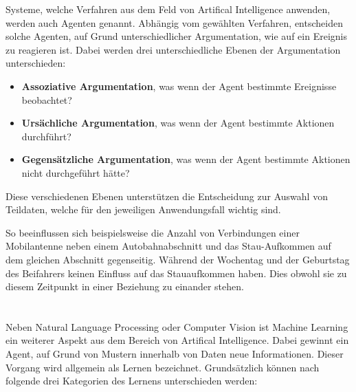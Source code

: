 Systeme, welche Verfahren aus dem Feld von \gls{Artifical Intelligence} anwenden, werden auch Agenten genannt. Abhängig vom gewählten Verfahren, entscheiden solche Agenten, auf Grund unterschiedlicher Argumentation, wie auf ein Ereignis zu reagieren ist. Dabei werden drei unterschiedliche Ebenen der Argumentation unterschieden:
\begin{itemize}
    \item \textbf{Assoziative Argumentation}, was wenn der Agent bestimmte Ereignisse beobachtet?
    \item \textbf{Ursächliche Argumentation}, was wenn der Agent bestimmte Aktionen durchführt?
    \item \textbf{Gegensätzliche Argumentation}, was wenn der Agent bestimmte Aktionen nicht durchgeführt hätte?
\end{itemize}
Diese verschiedenen Ebenen unterstützen die Entscheidung zur Auswahl von Teildaten, welche für den jeweiligen Anwendungsfall wichtig sind.

So beeinflussen sich beispielsweise die Anzahl von Verbindungen einer Mobilantenne neben einem Autobahnabschnitt und das Stau-Aufkommen auf dem gleichen Abschnitt gegenseitig. Während der Wochentag und der Geburtstag des Beifahrers keinen Einfluss auf das Stauaufkommen haben. Dies obwohl sie zu diesem Zeitpunkt in einer Beziehung zu einander stehen.


\section{}



Neben \gls{Natural Language Processing} oder \gls{Computer Vision} ist \gls{Machine Learning} ein weiterer Aspekt aus dem Bereich von \gls{Artifical Intelligence}. Dabei gewinnt ein Agent, auf Grund von Mustern innerhalb von Daten neue Informationen. Dieser Vorgang wird allgemein als Lernen bezeichnet. Grundsätzlich können nach \cite{Russell:2009:AIM:1671238} folgende drei Kategorien des Lernens unterschieden werden:

